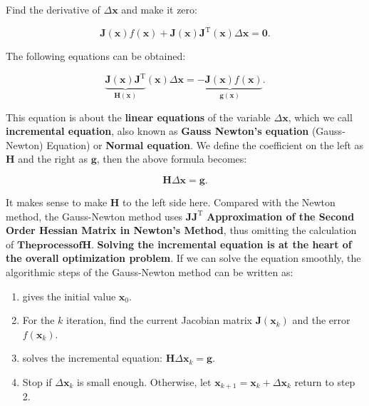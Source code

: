 Find the derivative of $\Delta \bm{x}$ and make it zero:

\begin{displaymath}
\bm{J} {\left( \bm{x} \right)}f\left( \bm{x} \right) + \bm{J} {\left( \bm{x} \right)} \bm{J}^\mathrm{T} \left( \bm{x} \right)\Delta \bm{x} = \bm{0}.
\end{displaymath}

The following equations can be obtained:

\begin{equation}
\underbrace{\bm{J} {\left( \bm{x} \right)} \bm{J}^\mathrm{T}}_{\bm{H}(\bm{x})} \left( \bm{x} \right)\Delta \bm{x} =  \underbrace{- \bm{J} {\left( \bm{x} \right)} f\left( \bm{x} \right)}_{\bm{g}(\bm{x})}.
\end{equation}

This equation is about the \textbf{linear equations} of the variable $\Delta \bm{x}$, which we call \textbf{incremental equation}, also known as \textbf{Gauss Newton's equation} (Gauss-Newton) Equation) or \textbf{Normal equation}. We define the coefficient on the left as $\bm{H}$ and the right as $\bm{g}$, then the above formula becomes:

\begin{equation}
\label{eq:minimize-deltax}
\bm{H} \Delta \bm{x} = \bm{g}.
\end{equation}

It makes sense to make $\bm{H}$ to the left side here. Compared with the Newton method, the Gauss-Newton method uses $\bm{J}\bm{J}^\mathrm{T}$ \textbf{Approximation of the Second Order Hessian Matrix in Newton's Method}, thus omitting the calculation of $\bm{ The process of H}$. \textbf{Solving the incremental equation is at the heart of the overall optimization problem}. If we can solve the equation smoothly, the algorithmic steps of the Gauss-Newton method can be written as:

\begin{mdframed}
	\begin{enumerate}
		\item gives the initial value $\bm{x}_0$.
		\item For the $k$ iteration, find the current Jacobian matrix $\bm{J}(\bm{x}_k)$ and the error $f(\bm{x}_k)$.
		\item solves the incremental equation: $\bm{H} \Delta \bm{x}_k = \bm{g}$.
		\item Stop if $\Delta \bm{x}_k$ is small enough. Otherwise, let $\bm{x}_{k+1} = \bm{x}_k+\Delta \bm{x}_k$ return to step 2.
	\end{enumerate}
\end{mdframed}

